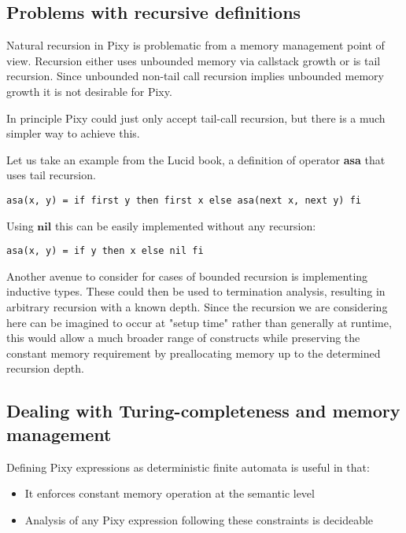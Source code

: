 \documentclass{scrartcl}
\begin{document}
    \subsection{Problems with recursive definitions}
    
    Natural recursion in Pixy is problematic from a memory management point of view. Recursion either uses unbounded memory via callstack growth or is tail recursion. Since unbounded non-tail call recursion implies unbounded memory growth it is not desirable for Pixy.
    
    In principle Pixy could just only accept tail-call recursion, but there is a much simpler way to achieve this.
    
    Let us take an example from the Lucid book, a definition of operator \textbf{asa} that uses tail recursion.
    \begin{lstlisting}
asa(x, y) = if first y then first x else asa(next x, next y) fi
    \end{lstlisting}
    
    Using $\textbf{nil}$ this can be easily implemented without any recursion:
    \begin{lstlisting}
asa(x, y) = if y then x else nil fi
    \end{lstlisting}
    
    Another avenue to consider for cases of bounded recursion is implementing inductive types. These could then be used to termination analysis, resulting in arbitrary recursion with a known depth. Since the recursion we are considering here can be imagined to occur at "setup time" rather than generally at runtime, this would allow a much broader range of constructs while preserving the constant memory requirement by preallocating memory up to the determined recursion depth.
    
    \subsection{Dealing with Turing-completeness and memory management}
    
    Defining Pixy expressions as deterministic finite automata is useful in that:
    \begin{itemize}
        \item It enforces constant memory operation at the semantic level
        \item Analysis of any Pixy expression following these constraints is decideable
    \end{itemize}
    
\end{document}

